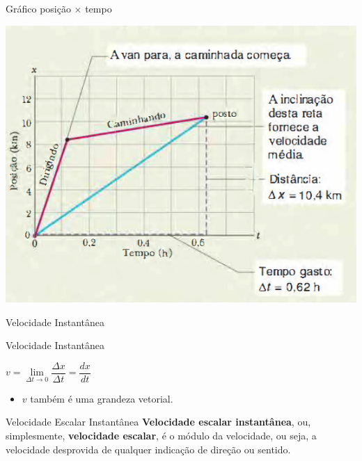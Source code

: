 \documentclass[xcolor=dvipsnames,table]{beamer}
\begin{document}
	\begin{frame}{Gráfico posição $\times$ tempo}
		\begin{center}
			\includegraphics[scale=0.5]{images/fig2-5}
		\end{center}
	\end{frame}

	\begin{frame}{Velocidade Instantânea}
		\begin{block}{Velocidade Instantânea}
			\begin{center}
				$v = \underset{\Delta t\rightarrow 0}{\lim} \dfrac{\Delta x}{\Delta t} = \dfrac{dx}{dt}$
			\end{center} \pause
			\begin{itemize}
				\item $v$ também é uma grandeza vetorial.
			\end{itemize}
		\end{block} \pause
		\begin{block}{Velocidade Escalar Instantânea}
			{\bf Velocidade escalar instantânea}, ou, simplesmente, {\bf velocidade escalar}, é o módulo da velocidade, ou seja, a velocidade desprovida de qualquer indicação de direção ou sentido.
		\end{block}
	\end{frame}
\end{document}
